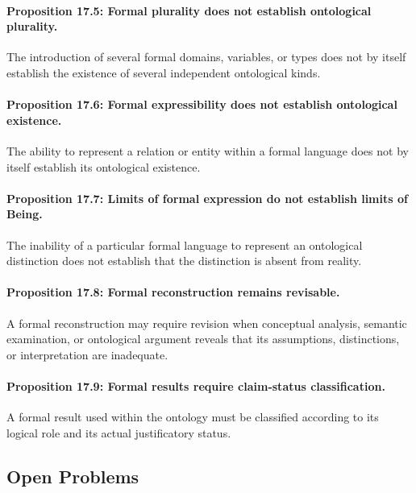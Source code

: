 \paragraph{Proposition 17.5: Formal plurality does not establish ontological plurality.}

The introduction
of several
formal domains,
variables, or
types does
not by itself
establish the
existence of
several independent
ontological kinds.

\paragraph{Proposition 17.6: Formal expressibility does not establish ontological existence.}

The ability
to represent
a relation
or entity
within a
formal language
does not
by itself
establish its
ontological existence.

\paragraph{Proposition 17.7: Limits of formal expression do not establish limits of Being.}

The inability
of a
particular formal
language to
represent an
ontological distinction
does not
establish that
the distinction
is absent
from reality.

\paragraph{Proposition 17.8: Formal reconstruction remains revisable.}

A formal
reconstruction may
require revision
when conceptual
analysis, semantic
examination, or
ontological argument
reveals that
its assumptions,
distinctions, or
interpretation are
inadequate.

\paragraph{Proposition 17.9: Formal results require claim-status classification.}

A formal
result used
within the
ontology must
be classified
according to
its logical
role and
its actual
justificatory status.

\subsection{Open Problems}

